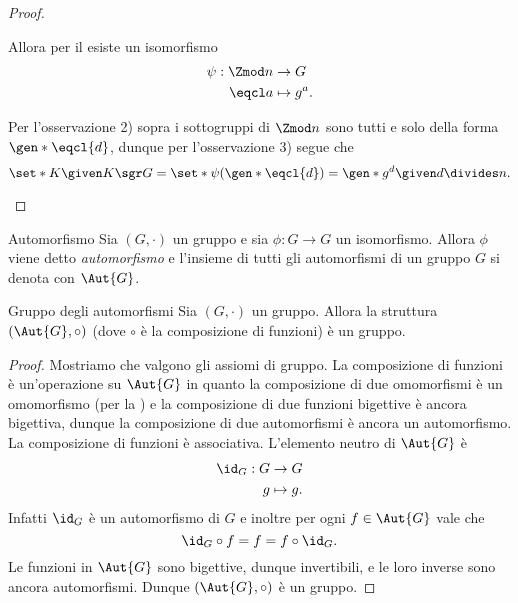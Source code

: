 \begin{proof}
\begin{enumerate}[label={(\roman*)}]
        Allora per il  esiste un isomorfismo \begin{align*}
            \psi : \Zmod n &\to G\\
            \eqcl a &\mapsto g^a.
        \end{align*}

        Per l'osservazione 2) sopra i sottogruppi di $\Zmod n$ sono tutti e solo della forma $\displaystyle \gen*{\eqcl{d}}$, dunque per l'osservazione 3) segue che \[
            \set*{K \given K \sgr G} = \set*{
                \psi(\gen*{\eqcl{d}}) 
            = \gen*{g^{d}} \given d \divides n}. \qedhere   
        \] 
    \end{enumerate}
\end{proof}

\begin{definition}{Automorfismo}{}
    Sia $(G, \cdot)$ un gruppo e sia $\phi : G \to G$ un isomorfismo. Allora $\phi$ viene detto \emph{automorfismo} e l'insieme di tutti gli automorfismi di un gruppo $G$ si denota con $\Aut{G}$.
\end{definition}

\begin{proposition}{Gruppo degli automorfismi}{}
    Sia $(G, \cdot)$ un gruppo. Allora la struttura $(\Aut{G}, \circ)$ (dove $\circ$ è la composizione di funzioni) è un gruppo.
\end{proposition}
\begin{proof}
    Mostriamo che valgono gli assiomi di gruppo.
     La composizione di funzioni è un'operazione su $\Aut{G}$ in quanto la composizione di due omomorfismi è un omomorfismo (per la ) e la composizione di due funzioni bigettive è ancora bigettiva, dunque la composizione di due automorfismi è ancora un automorfismo.
     La composizione di funzioni è associativa.
     L'elemento neutro di $\Aut{G}$ è \begin{align*}
        \id_G : G &\to G \\
        g &\mapsto g.
    \end{align*}  Infatti $\id_G$ è un automorfismo di $G$ e inoltre per ogni $f \in \Aut{G}$ vale che\[
        \id_G \circ{} f = f = f \circ \id_G.
    \]
     Le funzioni in $\Aut{G}$ sono bigettive, dunque invertibili, e le loro inverse sono ancora automorfismi.
    Dunque $(\Aut{G}, \circ)$ è un gruppo.
\end{proof}

